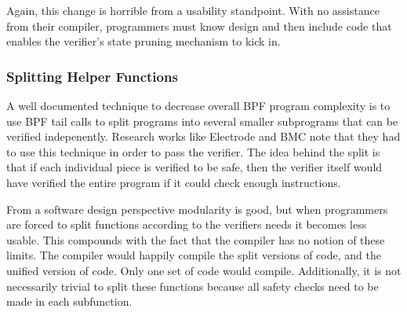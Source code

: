 Again, this change is horrible from a usability standpoint.
With no assistance from their compiler, programmers must know design and then include code that enables the verifier's state pruning mechanism to kick in.

\subsubsection{Splitting Helper Functions}
A well documented technique to decrease overall BPF program complexity is to use BPF tail calls to split programs into several smaller subprograms that can be verified indepenently.
Research works like Electrode and BMC note that they had to use this technique in order to pass the verifier.
The idea behind the split is that if each individual piece is verified to be safe, then the verifier itself would have verified the entire program if it could check enough instructions.

From a software design perspective modularity is good, but when programmers are forced to split functions according to the verifiers needs it becomes less usable.
This compounds with the fact that the compiler has no notion of these limits.
The compiler would happily compile the split versions of code, and the unified version of code.
Only one set of code would compile.
Additionally, it is not necessarily trivial to split these functions because all safety checks need to be made in each subfunction.
